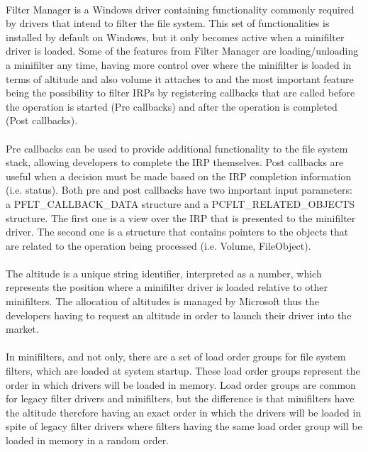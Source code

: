 		\paragraph{}
		Filter Manager is a Windows driver containing functionality commonly required by drivers that intend to filter the file system. This set of functionalities is installed by default on Windows, but it only becomes active when a minifilter driver is loaded. \cite{MSDNFltMgrConcepts} Some of the features from Filter Manager are loading/unloading a minifilter any time, having more control over where the minifilter is loaded in terms of altitude and also volume it attaches to and the most important feature being the possibility to filter IRPs by registering callbacks that are called before the operation is started (Pre callbacks) and after the operation is completed (Post callbacks). 
		
		\paragraph{}	
		Pre callbacks can be used to provide additional functionality to the file system stack, allowing developers to complete the IRP themselves. Post callbacks are useful when a decision must be made based on the IRP completion information (i.e. status). Both pre and post callbacks have two important input parameters: \\ a PFLT\_CALLBACK\_DATA structure and a PCFLT\_RELATED\_OBJECTS structure. The first one is a view over the IRP that is presented to the minifilter driver. The second one is a structure that contains pointers to the objects that are related to the operation being processed (i.e. Volume, FileObject).
		
		\paragraph{}
		The altitude is a unique string identifier, interpreted as a number, which represents the position where a minifilter driver is loaded relative to other minifilters. The allocation of altitudes is managed by Microsoft thus the developers having to request an altitude in order to launch their driver into the market. \cite{MSDNFltMgrConcepts}
		
		\paragraph{}
		In minifilters, and not only, there are a set of load order groups for file system filters, which are loaded at system startup. These load order groups represent the order in which drivers will be loaded in memory. \cite{MSDNFltMgrConcepts} Load order groups are common for legacy filter drivers and minifilters, but the difference is that minifilters have the altitude therefore having an exact order in which the drivers will be loaded in spite of legacy filter drivers where filters having the same load order group will be loaded in memory in a random order.
		
